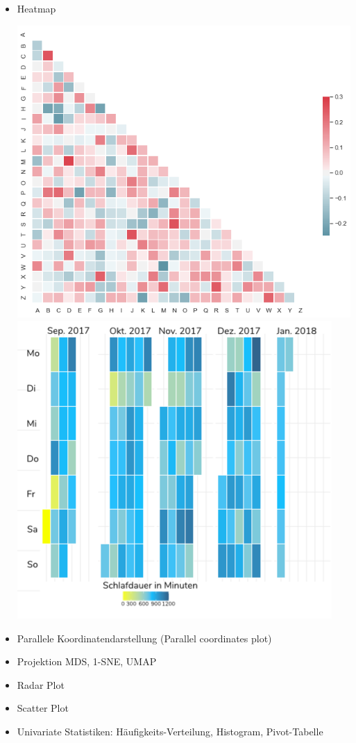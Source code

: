 \documentclass[
  12pt, %
  a4paper, %
  oneside, %
  openany, 
  numbers=noenddot, %
  BCOR=5mm, %
  parskip=half*, %
  thesis, %
]{bfhbook}
\begin{document}
\begin{itemize}
\begin{minipage}[t]{0.45\linewidth}
	\end{minipage}
        
	\item Heatmap 
	
	\begin{minipage}[t]{0.45\linewidth}
		\vspace{0pt}
		\includegraphics[width=0.6\linewidth]{Bilder/many_pairwise_correlations.png}
            \vspace{10pt}
            \includegraphics[width=0.6\linewidth]{Bilder/heatmap-sleep.PNG}
	\end{minipage}
	\begin{minipage}[t]{0.45\linewidth}
	
	\end{minipage}
	
	\item Parallele Koordinatendarstellung (Parallel coordinates plot)
	\item Projektion MDS, 1-SNE, UMAP
	\item Radar Plot
	\item Scatter Plot
	\item Univariate Statistiken: Häufigkeits-Verteilung, Histogram, Pivot-Tabelle
\end{itemize}
\end{document}
